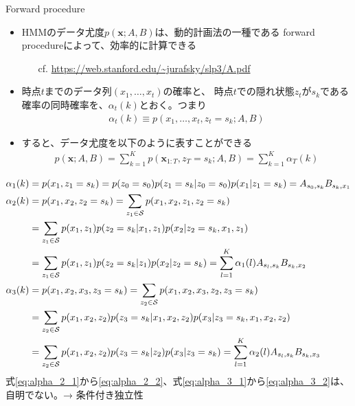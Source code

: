 \documentclass[aspectratio=169,unicode,dvipdfmx,14pt]{beamer}
\begin{document}
\begin{frame}{Forward procedure}
\begin{itemize}
\item HMMのデータ尤度$p(\bm{x}; A,B)$は、動的計画法の一種である
forward procedureによって、効率的に計算できる
\begin{itemize}
\item[cf.] \href{https://web.stanford.edu/~jurafsky/slp3/A.pdf}{https://web.stanford.edu/\~{}jurafsky/slp3/A.pdf}
\end{itemize}
\item 時点$t$までのデータ列$(x_1,\ldots,x_t)$の確率と、
時点$t$での隠れ状態$z_t$が$s_k$である確率の同時確率を、$\alpha_t(k)$とおく。つまり
\begin{align}
\alpha_t(k) \equiv p(x_1,\ldots, x_t, z_t=s_k; A, B)
\end{align}
\item すると、データ尤度を以下のように表すことができる
\begin{align}
p(\bm{x}; A,B) = \sum_{k=1}^K p(\bm{x}_{1:T}, z_T=s_k; A,B) = \sum_{k=1}^K \alpha_T(k)
\label{eq:data_LH}
\end{align}
\end{itemize}
\end{frame}

\begin{frame}{}
\FontMath
\vspace{-.25in}
\begin{align}
\alpha_1(k) & = p(x_1,z_1=s_k) = p(z_0=s_0)p(z_1=s_k|z_0=s_0)p(x_1|z_1=s_k) = A_{s_0,s_k} B_{s_k,x_1}
\label{eq:alpha_1} \\ 
\alpha_2(k) & = p(x_1, x_2, z_2=s_k) = \sum_{z_1 \in \mathcal{S}} p(x_1,x_2, z_1, z_2=s_k)
\notag \\ &
= \sum_{z_1 \in \mathcal{S}} p(x_1,z_1) p(z_2=s_k|x_1, z_1) p(x_2|z_2=s_k, x_1, z_1)
\label{eq:alpha_2_1} \\ &
= \sum_{z_1 \in \mathcal{S}} p(x_1,z_1) p(z_2=s_k|z_1) p(x_2|z_2=s_k)
= \sum_{l=1}^K \alpha_1(l) A_{s_l,s_k} B_{s_k,x_2}
\label{eq:alpha_2_2} \\
\alpha_3(k) & = p(x_1,x_2,x_3,z_3=s_k) = \sum_{z_2 \in \mathcal{S}} p(x_1,x_2, x_3, z_2, z_3=s_k)
\notag \\ &
= \sum_{z_2 \in \mathcal{S}} p(x_1,x_2, z_2) p(z_3=s_k|x_1,x_2,z_2) p(x_3|z_3=s_k,x_1,x_2,z_2)
\label{eq:alpha_3_1} \\ &
= \sum_{z_2 \in \mathcal{S}} p(x_1,x_2,z_2) p(z_3=s_k|z_2) p(x_3|z_3=s_k)
= \sum_{l=1}^K \alpha_2(l) A_{s_l,s_k} B_{s_k, x_3}
\label{eq:alpha_3_2} 
\end{align}
式\eqref{eq:alpha_2_1}から\eqref{eq:alpha_2_2}、式\eqref{eq:alpha_3_1}から\eqref{eq:alpha_3_2}は、自明でない。→ 条件付き独立性
\end{frame}
\end{document}
